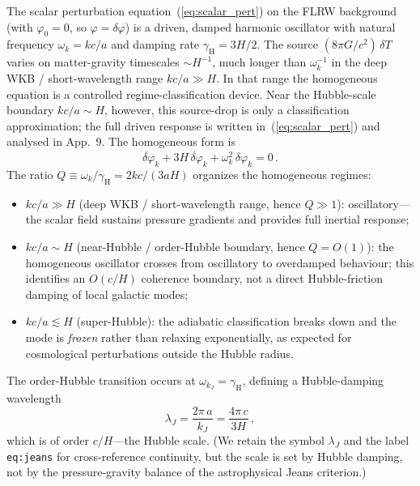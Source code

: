 \documentclass[aps,prd,onecolumn,superscriptaddress,nofootinbib,showpacs,12pt]{revtex4-2}
\begin{document}
The scalar perturbation equation~(\ref{eq:scalar_pert})
on the FLRW background (with $\varphi_{0}=0$, so
$\varphi = \delta\varphi$) is a driven, damped harmonic
oscillator with natural frequency $\omega_{k} = kc/a$ and
damping rate $\gamma_{\mathrm{H}} = 3H/2$.  The source
$(8\pi G/c^{2})\,\delta T$ varies on matter-gravity
timescales $\sim H^{-1}$, much longer than
$\omega_{k}^{-1}$ in the deep WKB / short-wavelength
range $kc/a\gg H$.  In that range the homogeneous equation
is a controlled regime-classification device.  Near the
Hubble-scale boundary $kc/a\sim H$, however, this
source-drop is only a classification approximation; the
full driven response is written in~(\ref{eq:scalar_pert})
and analysed in App.~9.  The homogeneous form is
\begin{equation}\label{eq:damped}
  \ddot{\delta\varphi}_{k}
  + 3H\,\dot{\delta\varphi}_{k}
  + \omega_{k}^{2}\,\delta\varphi_{k} = 0\,.
\end{equation}
The ratio $Q \equiv \omega_{k}/\gamma_{\mathrm{H}}
= 2kc/(3aH)$ organizes the homogeneous regimes:
\begin{itemize}
\item $kc/a\gg H$ (deep WKB / short-wavelength range,
  hence $Q\gg1$): oscillatory---the scalar field sustains
  pressure gradients and provides full inertial response;
\item $kc/a\sim H$ (near-Hubble / order-Hubble boundary,
  hence $Q=O(1)$): the homogeneous oscillator crosses from
  oscillatory to overdamped behaviour; this identifies an
  $O(c/H)$ coherence boundary, not a direct Hubble-friction
  damping of local galactic modes;
\item $kc/a \lesssim H$ (super-Hubble): the adiabatic
  classification breaks down and the mode is
  \emph{frozen} rather than relaxing exponentially, as
  expected for cosmological perturbations outside the
  Hubble radius.
\end{itemize}
The order-Hubble transition occurs at
$\omega_{k_{J}} = \gamma_{\mathrm{H}}$, defining a
Hubble-damping wavelength
\begin{equation}\label{eq:jeans}
  \lambda_{J} = \frac{2\pi\,a}{k_{J}}
              = \frac{4\pi\,c}{3H}\,,
\end{equation}
which is of order $c/H$---the Hubble scale.  (We retain
the symbol $\lambda_{J}$ and the label
\texttt{eq:jeans} for cross-reference continuity, but
the scale is set by Hubble damping, not by the
pressure-gravity balance of the astrophysical Jeans
criterion.)

\end{document}
